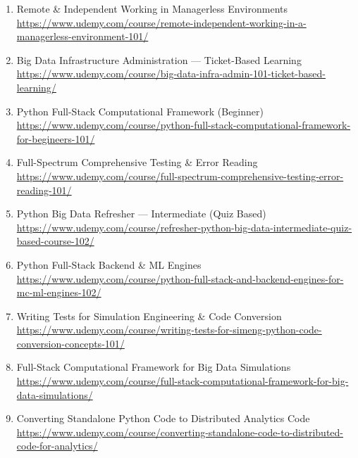 \documentclass[12pt]{article}
\begin{document}
	\begin{enumerate}[label=\textbf{Course \arabic*:}]
		\item Remote \& Independent Working in Managerless Environments  
		\href{https://www.udemy.com/course/remote-independent-working-in-a-managerless-environment-101/}
		{https://www.udemy.com/course/remote-independent-working-in-a-managerless-environment-101/}
		
		\item Big Data Infrastructure Administration — Ticket-Based Learning  
		\href{https://www.udemy.com/course/big-data-infra-admin-101-ticket-based-learning/}
		{https://www.udemy.com/course/big-data-infra-admin-101-ticket-based-learning/}
		
		\item Python Full-Stack Computational Framework (Beginner)  
		\href{https://www.udemy.com/course/python-full-stack-computational-framework-for-begineers-101/}
		{https://www.udemy.com/course/python-full-stack-computational-framework-for-begineers-101/}
		
		\item Full-Spectrum Comprehensive Testing \& Error Reading  
		\href{https://www.udemy.com/course/full-spectrum-comprehensive-testing-error-reading-101/}
		{https://www.udemy.com/course/full-spectrum-comprehensive-testing-error-reading-101/}
		
		\item Python Big Data Refresher — Intermediate (Quiz Based)  
		\href{https://www.udemy.com/course/refresher-python-big-data-intermediate-quiz-based-course-102/}
		{https://www.udemy.com/course/refresher-python-big-data-intermediate-quiz-based-course-102/}
		
		\item Python Full-Stack Backend \& ML Engines  
		\href{https://www.udemy.com/course/python-full-stack-and-backend-engines-for-mc-ml-engines-102/}
		{https://www.udemy.com/course/python-full-stack-and-backend-engines-for-mc-ml-engines-102/}
		
		\item Writing Tests for Simulation Engineering \& Code Conversion  
		\href{https://www.udemy.com/course/writing-tests-for-simeng-python-code-conversion-concepts-101/}
		{https://www.udemy.com/course/writing-tests-for-simeng-python-code-conversion-concepts-101/}
		
		\item Full-Stack Computational Framework for Big Data Simulations  
		\href{https://www.udemy.com/course/full-stack-computational-framework-for-big-data-simulations/}
		{https://www.udemy.com/course/full-stack-computational-framework-for-big-data-simulations/}
		
		\item Converting Standalone Python Code to Distributed Analytics Code  
		\href{https://www.udemy.com/course/converting-standalone-code-to-distributed-code-for-analytics/}
		{https://www.udemy.com/course/converting-standalone-code-to-distributed-code-for-analytics/}
	\end{enumerate}
	
\end{document}
